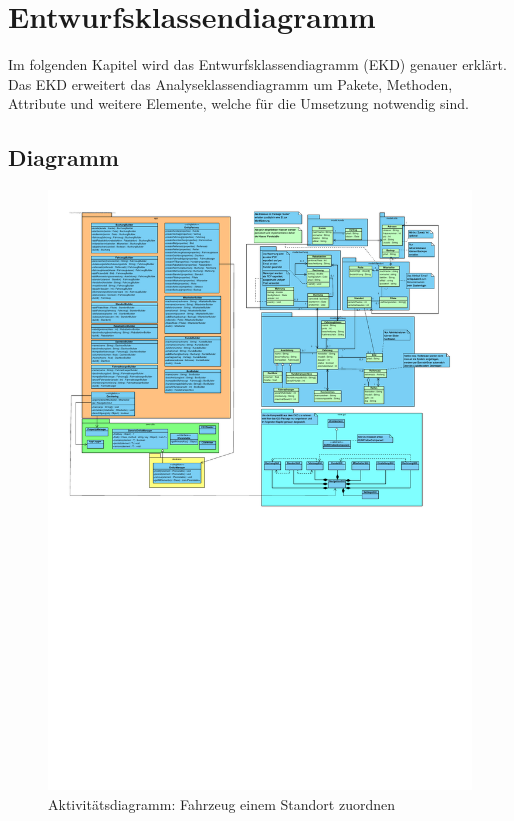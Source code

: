 \chapter{Entwurfsklassendiagramm}

Im folgenden Kapitel wird das Entwurfsklassendiagramm (EKD) genauer erklärt. Das EKD erweitert das Analyseklassendiagramm um Pakete, Methoden, Attribute und weitere Elemente, welche für die Umsetzung notwendig sind.

\section{Diagramm}

\begin{figure}[!ht]
    \centering
    \includegraphics[width=\textwidth, trim = 0cm 14cm 0cm 0cm]{Bilder/Diagramme/Entwurfsklassendiagramm_v2.pdf}
    \caption{Aktivitätsdiagramm: Fahrzeug einem Standort zuordnen}
    \label{img:ekd}
\end{figure}

